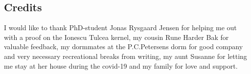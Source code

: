 \subsection{Credits}
I would like to thank PhD-student Jonas Rysgaard Jensen for helping me
out with a proof on the Ionescu Tulcea kernel,
my cousin Rune Harder Bak for valuable feedback,
my dormmates at the P.C.Petersens dorm for good company and very necessary
recreational breaks from writing,
my aunt Susanne for letting me stay at her house during the covid-19 and
my family for love and support.

